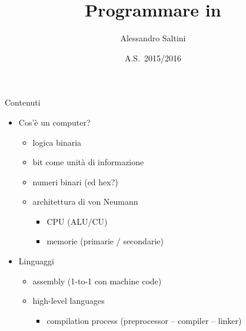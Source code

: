\documentclass[xcolor=dvipsnames,handout]{beamer}
\title[\CC]{Programmare in \CC}
\author[A.~Saltini]{Alessandro Saltini}
\institute[LS Tassoni]{Liceo Scientifico Statale ``A.~Tassoni''}
\date{A.S.~2015/2016}
\begin{document}
\begin{frame}[noframenumbering]
  \titlepage
\end{frame}

\begin{frame}{Contenuti}
  \begin{itemize}
    \item Cos'è un computer?
    \begin{itemize}
      \item logica binaria
      \item bit come unità di informazione
      \item numeri binari (ed hex?)
      \item architettura di von Neumann
      \begin{itemize}
        \item CPU (ALU/CU)
        \item memorie (primarie / secondarie)
      \end{itemize}
    \end{itemize}
    \item Linguaggi
    \begin{itemize}
      \item assembly (1-to-1 con machine code)
      \item high-level languages
      \begin{itemize}
        \item compilation process (preprocessor -- compiler -- linker)
      \end{itemize}
    \end{itemize}
  \end{itemize}
\end{frame}
\end{document}
